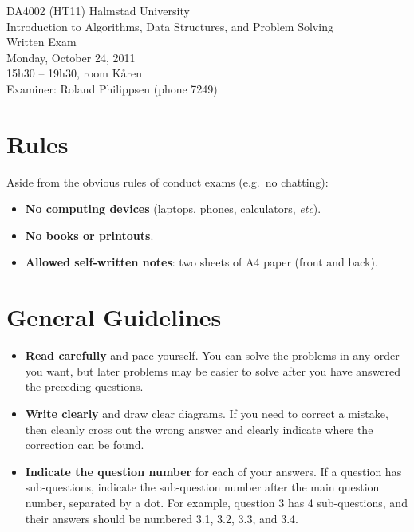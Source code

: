 \documentclass[a4paper]{article}
\newcounter{question}
\begin{document}
\pagestyle{empty}
\thispagestyle{empty}



\noindent
\begin{minipage}{\columnwidth}
  \centering
  \Large
  DA4002 (HT11) Halmstad University\\
  Introduction to Algorithms, Data Structures, and Problem Solving\\[3\baselineskip]
  \Huge
  Written Exam\\
  \Large
  Monday, October 24, 2011\\
  15h30 -- 19h30, room K{\aa}ren\\[2\baselineskip]
  Examiner: Roland Philippsen (phone 7249)
\end{minipage}

\vfill

\noindent
\begin{center}
\end{center}

\vfill



\section*{Rules}

Aside from the obvious rules of conduct exams (e.g.\ no chatting):

\begin{itemize}
\item
  \textbf{No computing devices} (laptops, phones, calculators, \emph{etc}).
\item
  \textbf{No books or printouts}.
\item
  \textbf{Allowed self-written notes}: two sheets of A4 paper (front and back).
\end{itemize}



\section*{General Guidelines}

\begin{itemize}
\item
  \textbf{Read carefully} and pace yourself.
  You can solve the problems in any order you want, but later problems may be easier to solve after you have answered the preceding questions.
\item
  \textbf{Write clearly} and draw clear diagrams.
  If you need to correct a mistake, then cleanly cross out the wrong answer and clearly indicate where the correction can be found.
\item
  \textbf{Indicate the question number} for each of your answers.
  If a question has sub-questions, indicate the sub-question number after the main question number, separated by a dot.
  For example, question 3 has 4 sub-questions, and their answers should be numbered 3.1, 3.2, 3.3, and 3.4.
\end{itemize}
\end{document}
